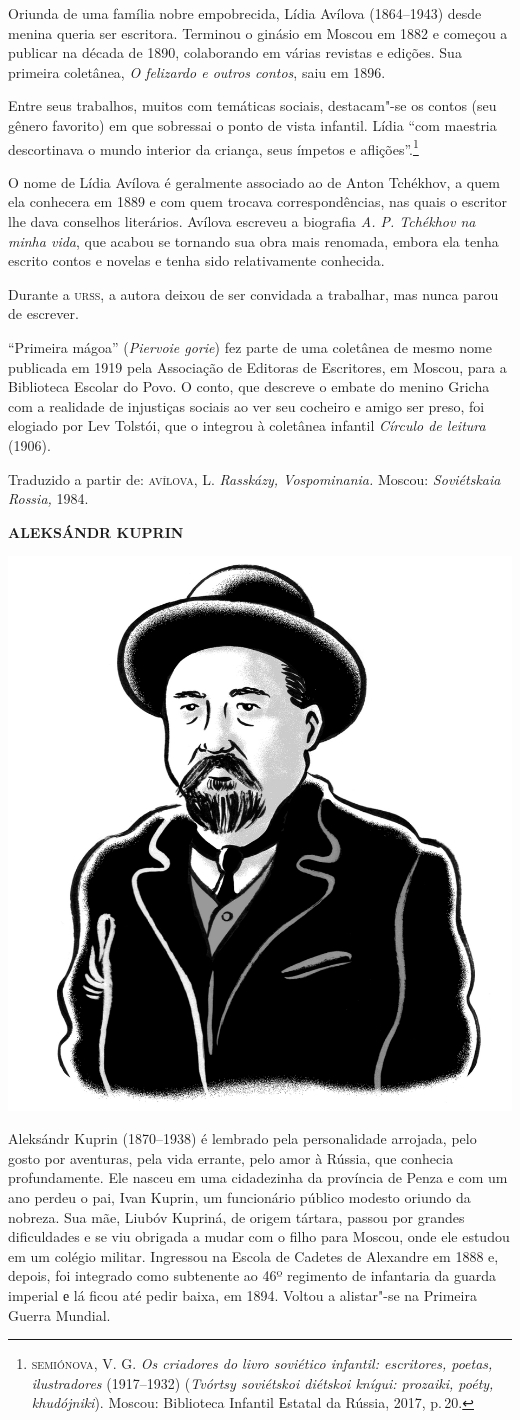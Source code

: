 \noindent{}Oriunda de uma família nobre empobrecida, Lídia Avílova (1864--1943)
desde menina queria ser escritora. Terminou o ginásio em Moscou em 1882
e começou a publicar na década de 1890, colaborando em várias revistas e
edições. Sua primeira coletânea, \emph{O felizardo e outros contos},
saiu em 1896.

Entre seus trabalhos, muitos com temáticas sociais, destacam"-se os
contos (seu gênero favorito) em que sobressai o ponto de vista infantil.
Lídia ``com maestria descortinava o mundo interior da criança, seus
ímpetos e aflições''.\footnote{\scriptsize\textsc{semiónova}, V. G. \emph{Os criadores do
  livro soviético infantil: escritores, poetas, ilustradores}
  (1917--1932) (\emph{Tvórtsy soviétskoi diétskoi knígui: prozaiki,
  poéty, khudójniki}). Moscou: Biblioteca Infantil Еstatal da Rússia,
  2017, p.\,20.}

O nome de Lídia Avílova é geralmente associado ao de Anton Tchékhov, a
quem ela conhecera em 1889 e com quem trocava correspondências, nas
quais o escritor lhe dava conselhos literários. Avílova escreveu a
biografia \emph{A. P. Tchékhov na minha vida}, que acabou se tornando
sua obra mais renomada, embora ela tenha escrito contos e novelas e
tenha sido relativamente conhecida.

Durante a \textsc{urss}, a autora deixou de ser convidada a trabalhar, mas nunca
parou de escrever.

``Primeira mágoa'' (\emph{Piervoie gorie}) fez parte de uma coletânea de
mesmo nome publicada em 1919 pela Associação de Editoras de
Escritores, em Moscou, para a Biblioteca Escolar do Povo. O
conto, que descreve o embate do menino Gricha com a realidade de
injustiças sociais ao ver seu cocheiro e amigo ser preso, foi elogiado
por Lev Tolstói, que o integrou à coletânea infantil \emph{Círculo de
leitura} (1906).

Traduzido a partir de:
\textsc{avílova}, L. \emph{Rasskázy, Vospominania.} Moscou: \emph{Soviétskaia
Rossia,} 1984.

\bigskip
\noindent\textbf{ALEKSÁNDR KUPRIN}\medskip

\noindent\includegraphics[width=.8in]{./imgs/autor9.jpg}

\noindent{}Aleksándr Kuprin (1870--1938) é lembrado pela personalidade arrojada,
pelo gosto por aventuras, pela vida errante, pelo amor à Rússia, que
conhecia profundamente. Ele nasceu em uma cidadezinha da província de
Penza e com um ano perdeu o pai, Ivan Kuprin, um
funcionário público modesto oriundo da nobreza. Sua mãe, Liubóv Kupriná, de origem tártara, passou por grandes dificuldades e se
viu obrigada a mudar com o filho para Moscou, onde ele estudou em um
colégio militar. Ingressou na Escola de Cadetes de Alexandre em 1888 e,
depois, foi integrado como subtenente ao 46º regimento de infantaria da
guarda imperial е lá ficou até pedir baixa, em 1894. Voltou a alistar"-se
na Primeira Guerra Mundial.

